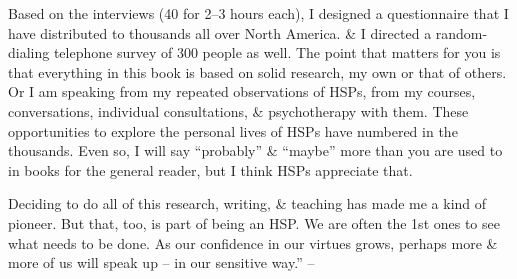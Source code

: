 \documentclass{article}
\numberwithin{equation}{section}
\begin{document}
Based on the interviews (40 for 2--3 hours each), I designed a questionnaire that I have distributed to thousands all over North America. \& I directed a random-dialing telephone survey of 300 people as well. The point that matters for you is that everything in this book is based on solid research, my own or that of others. Or I am speaking from my repeated observations of HSPs, from my courses, conversations, individual consultations, \& psychotherapy with them. These opportunities to explore the personal lives of HSPs have numbered in the thousands. Even so, I will say ``probably'' \& ``maybe'' more than you are used to in books for the general reader, but I think HSPs appreciate that.

Deciding to do all of this research, writing, \& teaching has made me a kind of pioneer. But that, too, is part of being an HSP. We are often the 1st ones to see what needs to be done. As our confidence in our virtues grows, perhaps more \& more of us will speak up -- in our sensitive way.'' -- \cite[p. 33]{Aron2013}
\end{document}
